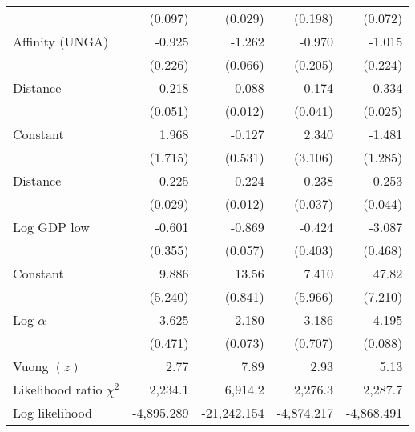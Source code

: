 \begin{table}[htbp]
\begin{tabular}{l*{4}{D{.}{.}{-1}}}
   &     (0.097)         &     (0.029)         &     (0.198)         &     (0.072)         \\
\addlinespace
Affinity (UNGA) &      -0.925\sym{***}&      -1.262\sym{***}&      -0.970\sym{***}&      -1.015\sym{***}\\
   &     (0.226)         &     (0.066)         &     (0.205)         &     (0.224)         \\
\addlinespace
Distance&      -0.218\sym{***}&     -0.088\sym{***}&      -0.174\sym{***}&      -0.334\sym{***}\\
   &     (0.051)         &     (0.012)         &     (0.041)         &     (0.025)         \\
\addlinespace
Constant&       1.968         &      -0.127         &       2.340         &      -1.481         \\
   &     (1.715)         &     (0.531)         &     (3.106)         &     (1.285)         \\
\midrule
Distance&       0.225\sym{***}&       0.224\sym{***}&       0.238\sym{***}&       0.253\sym{***}\\
   &     (0.029)         &     (0.012)         &     (0.037)         &     (0.044)         \\
\addlinespace
Log GDP low&      -0.601\sym{+}  &      -0.869\sym{***}&      -0.424         &      -3.087\sym{***}\\
   &     (0.355)         &     (0.057)         &     (0.403)         &     (0.468)         \\
\addlinespace
Constant&       9.886\sym{+}  &       13.56\sym{***}&       7.410         &       47.82\sym{***}\\
   &     (5.240)         &     (0.841)         &     (5.966)         &     (7.210)         \\
\midrule
Log $\alpha$&       3.625\sym{***}&       2.180\sym{***}&       3.186\sym{***}&       4.195\sym{***}\\
   &     (0.471)         &     (0.073)         &     (0.707)         &     (0.088)         \\
Vuong $(z)$&          2.77           &            7.89           &         2.93             &        5.13              \\
Likelihood ratio $\chi^{2}$&      2,234.1\sym{***}         &      6,914.2\sym{***}         &      2,276.3\sym{***}         &      2,287.7\sym{***}         \\
Log likelihood&               -4,895.289      &             -21,242.154         &       -4,874.217               &         -4,868.491             \\

\end{tabular}
\end{table}
